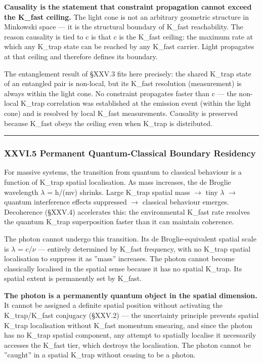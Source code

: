 \documentclass[12pt,a4paper]{article}
\begin{document}
\textbf{Causality is the statement that constraint propagation cannot exceed the K\_fast ceiling.} The light cone is not an arbitrary geometric structure in Minkowski space --- it is the structural boundary of K\_fast reachability. The reason causality is tied to c is that c is the K\_fast ceiling: the maximum rate at which any K\_trap state can be reached by any K\_fast carrier. Light propagates at that ceiling and therefore defines its boundary.

The entanglement result of §XXV.3 fits here precisely: the shared K\_trap state of an entangled pair is non-local, but its K\_fast resolution (measurement) is always within the light cone. No constraint propagates faster than c --- the non-local K\_trap correlation was established at the emission event (within the light cone) and is resolved by local K\_fast measurements. Causality is preserved because K\_fast obeys the ceiling even when K\_trap is distributed.

\begin{center}
\rule{0.5\textwidth}{0.4pt}
\end{center}

\subsubsection{XXVI.5 Permanent Quantum-Classical Boundary Residency}

For massive systems, the transition from quantum to classical behaviour is a function of K\_trap spatial localisation. As mass increases, the de Broglie wavelength $\lambda$ = h/(mv) shrinks. Large K\_trap spatial mass $\rightarrow$ tiny $\lambda$ $\rightarrow$ quantum interference effects suppressed $\rightarrow$ classical behaviour emerges. Decoherence (§XXV.4) accelerates this: the environmental K\_fast rate resolves the quantum K\_trap superposition faster than it can maintain coherence.

The photon cannot undergo this transition. Its de Broglie-equivalent spatial scale is $\lambda$ = c/$\nu$ --- entirely determined by K\_fast frequency, with no K\_trap spatial localisation to suppress it as ''mass'' increases. The photon cannot become classically localised in the spatial sense because it has no spatial K\_trap. Its spatial extent is permanently set by K\_fast.

\textbf{The photon is a permanently quantum object in the spatial dimension.} It cannot be assigned a definite spatial position without activating the K\_trap/K\_fast conjugacy (§XXV.2) --- the uncertainty principle prevents spatial K\_trap localisation without K\_fast momentum smearing, and since the photon has no K\_trap spatial component, any attempt to spatially localise it necessarily accesses the K\_fast tier, which destroys the localisation. The photon cannot be ''caught'' in a spatial K\_trap without ceasing to be a photon.
\end{document}

